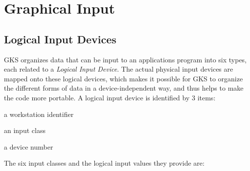 \section{Graphical Input}
\subsection{\protect\label{sec:inphdr}Logical Input Devices}
 
GKS organizes data that can be input to an applications program
into six types, each related to a {\it Logical Input Device}.
The actual physical input devices are mapped onto these logical
devices, which makes it possible for GKS to organize the different
forms of data in a device-independent way, and thus helps to make the
code more portable.
A logical input device is identified by 3 items:
\begin{OL}
\item a workstation identifier
\item an input class
\item a device number
\end{OL}
The six input classes and the logical input values they provide are:
